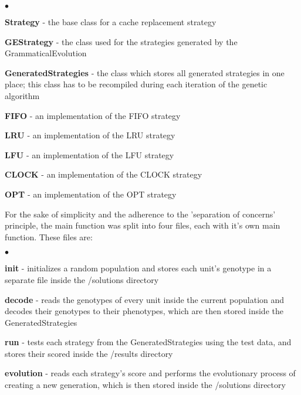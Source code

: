 \begin{list}{$\bullet$}{}  	
	\item \textbf{Strategy} - the base class for a cache replacement strategy
	\item \textbf{GEStrategy} - the class used for the strategies generated by the GrammaticalEvolution
	\item \textbf{GeneratedStrategies} - the class which stores all generated strategies in one place; this class has to be recompiled during each iteration of the genetic algorithm
	\item \textbf{FIFO} - an implementation of the FIFO strategy
	\item \textbf{LRU} - an implementation of the LRU strategy
	\item \textbf{LFU} - an implementation of the LFU strategy
	\item \textbf{CLOCK} - an implementation of the CLOCK strategy
	\item \textbf{OPT} - an implementation of the OPT strategy
\end{list}

For the sake of simplicity and the adherence to the 'separation of concerns' principle, the main function was split into four files, each with it's own main function. These files are:

\begin{list}{$\bullet$}{}  	
	\item \textbf{init} - initializes a random population and stores each unit's genotype in a separate file inside the /solutions directory
	\item \textbf{decode} - reads the genotypes of every unit inside the current population and decodes their genotypes to their phenotypes, which are then stored inside the GeneratedStrategies
	\item \textbf{run} - tests each strategy from the GeneratedStrategies using the test data, and stores their scored inside the /results directory
	\item \textbf{evolution} - reads each strategy's score and performs the evolutionary process of creating a new generation, which is then stored inside the /solutions directory
\end{list}

